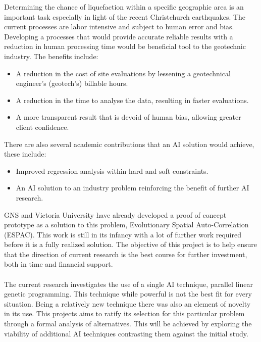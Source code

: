 \documentclass[11pt, a4paper, twoside, openright]{report}
\begin{document}
Determining the chance of liquefaction within a specific geographic area is an important
task especially in light of the recent Christchurch earthquakes. The current
processes are labor intensive and subject to human error and bias. Developing a processes that would provide accurate reliable results with a reduction in human processing time would be beneficial tool to the geotechnic industry. The benefits include: 
\begin{itemize}
\item A reduction in the cost of site evaluations by lessening a geotechnical engineer's (geotech's) billable hours.
\item A reduction in the time to analyse    the data, resulting in faster evaluations.
\item A more transparent result that is devoid of human bias, allowing greater client confidence.
\end{itemize}
There are also several academic contributions that an AI solution would achieve, these include:
\begin{itemize}
 \item Improved regression analysis within hard and soft constraints.
 \item An AI solution to an industry problem reinforcing the benefit of further AI research.
\end{itemize}


GNS and
Victoria University have already developed a proof of concept prototype as a solution to this problem, Evolutionary Spatial Auto-Correlation (ESPAC). This work is still in its infancy with a lot of further work required before it is a fully realized solution. The objective of this project is to help ensure that the direction of current research is the best course for further investment, both in time and financial support\cite{scoble1}. 
\\
\\
The current research investigates the use of a single AI technique, parallel linear genetic programming. This technique while powerful is not the best fit for every situation\cite{zhang1}. Being a relatively new technique there was also an element of novelty in its use. This projects aims to ratify its selection for this particular problem through a formal analysis of alternatives. This will be achieved by exploring the viability of additional AI techniques contrasting them against the initial study.
\end{document}
